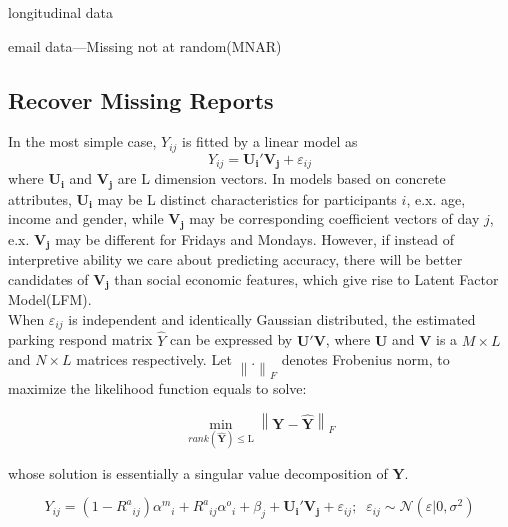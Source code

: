 \documentclass[preprint,12pt]{elsarticle}
\begin{document}
longitudinal data

email data---Missing not at random(MNAR)\\

\subsection{Recover Missing Reports} 


In the most simple case, $Y_{ij}$ is fitted by a linear model as
\[{Y_{ij}} = {\mathbf{U_i}}'{\mathbf{V_j}} + {\varepsilon _{ij}}\]
where $\mathbf{U_i}$ and $\mathbf{V_j}$ are L dimension vectors. In models based on concrete attributes, $\mathbf{U_i}$ may be L distinct characteristics for participants $i$, e.x. age, income and gender, while $\mathbf{V_j}$ may be corresponding coefficient vectors of day $j$, e.x. $\mathbf{V_j}$ may be different for Fridays and Mondays. However, if instead of interpretive ability we care about predicting accuracy, there will be better candidates of $\mathbf{V_j}$ than social economic features, which give rise to Latent Factor Model(LFM).\\     

When $\varepsilon _{ij}$ is independent and identically Gaussian distributed, the estimated parking respond matrix $\hat{Y}$ can be expressed by $\mathbf{U}'\mathbf{V}$, where $\mathbf{U}$ and $\mathbf{V}$ is a $M\times L$ and $N\times L$ matrices respectively. Let ${\left\| . \right\|_F}$ denotes Frobenius norm, to maximize the likelihood function equals to solve:

\[{\min _{rank(\widehat {\mathbf{Y}}) \leqslant {\text{L}}}}{\left\| {{\mathbf{Y - }}\widehat {\mathbf{Y}}} \right\|_F}\]

whose solution is essentially a singular value decomposition of $\mathbf{Y}$. 

\[{Y_{ij}} = (1 - {R^a}_{ij}){\alpha ^m}_i + {R^a}_{ij}{\alpha ^o}_i + {\beta _j} + {{\mathbf{U}}_{\mathbf{i}}}{\mathbf{'}}{{\mathbf{V}}_{\mathbf{j}}} + {\varepsilon _{ij}};\;\;{\varepsilon _{ij}} \sim \mathcal{N}(\varepsilon |0,{\sigma ^2})\]
\end{document}
